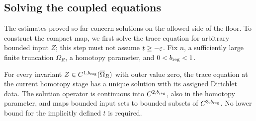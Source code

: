 \subsection{Solving the coupled equations}\label{e:solve}

The estimates proved so far concern solutions on the allowed side of
the floor.  To construct the compact map, we first solve the trace
equation for arbitrary bounded input $Z$; this step must not assume
$t\ge-\varepsilon$.  Fix $n$, a sufficiently large finite truncation
$\Omega_R$, a homotopy parameter, and $0<b_{\rm reg}<1$.

\begin{lemma}\label{e:trace-solve}
For every invariant $Z\in C^{1,b_{\rm reg}}(\overline\Omega_R)$ with
outer value zero, the trace equation at the current homotopy stage has
a unique solution with its assigned Dirichlet data.  The solution
operator is continuous into $C^{2,b_{\rm reg}}$, also in the homotopy
parameter, and maps bounded input sets to bounded subsets of
$C^{3,b_{\rm reg}}$.  No lower bound for the implicitly defined $t$
is required.
\end{lemma}

